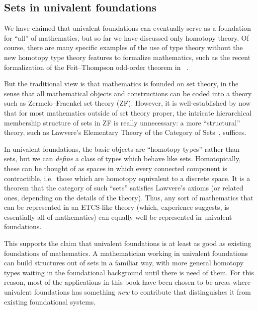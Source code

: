 \subsection*{Sets in univalent foundations}

%

We have claimed that univalent foundations can eventually serve as a foundation for ``all'' of mathematics, but so far we have discussed 
only homotopy theory.  Of course, there are many specific examples of the use of type theory without the new homotopy type theory features to formalize mathematics,
%
%
%
%
%
such as the recent formalization of the Feit--Thompson odd-order theorem in \Coq~\cite{gonthier}.

But the traditional view is that mathematics is founded on set theory, in the sense that all mathematical objects and constructions can be coded into a theory such as Zermelo--Fraenkel set theory (ZF).
%
%
%
%
However, it is well-established by now that for most mathematics outside of set theory proper, the intricate hierarchical membership structure of sets in ZF is really unnecessary: a more ``structural'' theory, such as Lawvere's Elementary Theory of the Category of Sets~\cite{lawvere:etcs-long}, suffices.
%

In univalent foundations, the basic objects are ``homotopy types'' rather than sets, but we can \emph{define} a class of types which behave like sets.
Homotopically, these can be thought of as spaces in which every connected component is contractible, i.e.\ those which are homotopy equivalent to a discrete space.
%
It is a theorem  that the category of such ``sets'' satisfies Lawvere's axioms (or related ones, depending on the details of the theory).
Thus, any sort of mathematics that can be represented in an ETCS-like theory (which, experience suggests, is essentially all of mathematics) can equally well be represented in univalent foundations.  

This supports the claim that univalent foundations is at least as good as existing foundations of mathematics.
A mathematician working in univalent foundations can build structures out of sets in a familiar way, with more general homotopy types waiting in the foundational background until there is need of them.
For this reason, most of the applications in this book have been chosen to be areas where univalent foundations has something \emph{new} to contribute that distinguishes it from existing foundational systems.

